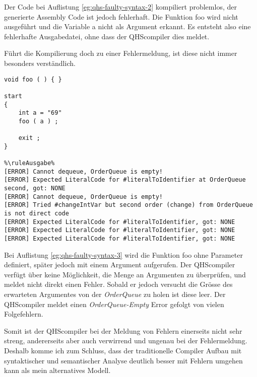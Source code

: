Der Code bei Auflistung \ref{eg:qhs-faulty-syntax-2} kompiliert problemlos, der generierte Assembly Code ist jedoch fehlerhaft. Die Funktion foo wird nicht ausgeführt und die Variable a nicht als Argument erkannt.
Es entsteht also eine fehlerhafte Ausgabedatei, ohne dass der QHScompiler dies meldet.

Führt die Kompilierung doch zu einer Fehlermeldung, ist diese nicht immer besonders verständlich.

\begin{lstlisting}[language=QHS, caption=QHS mit falscher Anzahl Argumente, label=eg:qhs-faulty-syntax-3]
%\ruleEingabe%
void foo ( ) { }

start
{
    int a = "69" 
    foo ( a ) ;

    exit ;
}

%\ruleAusgabe%
[ERROR] Cannot dequeue, OrderQueue is empty!
[ERROR] Expected LiteralCode for #literalToIdentifier at OrderQueue second, got: NONE
[ERROR] Cannot dequeue, OrderQueue is empty!
[ERROR] Tried #changeIntVar but second order (change) from OrderQueue is not direct code
[ERROR] Expected LiteralCode for #literalToIdentifier, got: NONE
[ERROR] Expected LiteralCode for #literalToIdentifier, got: NONE
[ERROR] Expected LiteralCode for #literalToIdentifier, got: NONE
\end{lstlisting}

Bei Auflistung \ref{eg:qhs-faulty-syntax-3} wird die Funktion foo ohne Parameter definiert, später jedoch mit einem Argument aufgerufen.
Der QHScompiler verfügt über keine Möglichkeit, die Menge an Argumenten zu überprüfen, und meldet nicht direkt einen Fehler. 
Sobald er jedoch versucht die Grösse des erwarteten Argumentes von der \textit{OrderQueue} zu holen ist diese leer.
Der QHScompiler meldet einen \textit{OrderQueue-Empty} Error gefolgt von vielen Folgefehlern.


Somit ist der QHScompiler bei der Meldung von Fehlern einerseits nicht sehr streng, andererseits aber auch verwirrend und ungenau bei der Fehlermeldung.
Deshalb komme ich zum Schluss, dass der traditionelle Compiler Aufbau mit syntaktischer und semantischer Analyse deutlich besser mit Fehlern umgehen kann als mein alternatives Modell.

